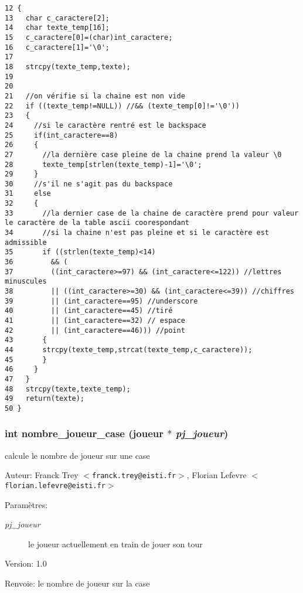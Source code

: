 \begin{Code}\begin{verbatim}12 {
13   char c_caractere[2];
14   char texte_temp[16];
15   c_caractere[0]=(char)int_caractere;
16   c_caractere[1]='\0';
17 
18   strcpy(texte_temp,texte);
19   
20   
21   //on vérifie si la chaine est non vide
22   if ((texte_temp!=NULL)) //&& (texte_temp[0]!='\0'))
23   {
24     //si le caractère rentré est le backspace
25     if(int_caractere==8)
26     {
27       //la dernière case pleine de la chaine prend la valeur \0
28       texte_temp[strlen(texte_temp)-1]='\0';
29     }
30     //s'il ne s'agit pas du backspace
31     else
32     {
33       //la dernier case de la chaine de caractère prend pour valeur le caractère de la table ascii coorespondant
34       //si la chaine n'est pas pleine et si le caractère est admissible
35       if ((strlen(texte_temp)<14) 
36         && ( 
37         ((int_caractere>=97) && (int_caractere<=122)) //lettres minuscules
38         || ((int_caractere>=30) && (int_caractere<=39)) //chiffres
39         || (int_caractere==95) //underscore
40         || (int_caractere==45) //tiré
41         || (int_caractere==32) // espace
42         || (int_caractere==46))) //point
43       {
44       strcpy(texte_temp,strcat(texte_temp,c_caractere));
45       }
46     }
47   }
48   strcpy(texte,texte_temp);
49   return(texte);
50 }
\end{verbatim}\end{Code}


\subsubsection{\setlength{\rightskip}{0pt plus 5cm}int nombre\_\-joueur\_\-case ({\bf joueur} $\ast$ {\em pj\_\-joueur})}\label{outils_8c_628b8ba74e55cbdc77d8c2e5e594bc8e}


calcule le nombre de joueur sur une case 

\begin{Desc}
\item[Auteur:]Franck Trey $<${\tt franck.trey@eisti.fr}$>$, Florian Lefevre $<${\tt florian.lefevre@eisti.fr}$>$\end{Desc}
\begin{Desc}
\item[Param\`{e}tres:]
\begin{description}
\item[{\em pj\_\-joueur}]le joueur actuellement en train de jouer son tour\end{description}
\end{Desc}
\begin{Desc}
\item[Version:]1.0 \end{Desc}
\begin{Desc}
\item[Renvoie:]le nombre de joueur sur la case \end{Desc}


